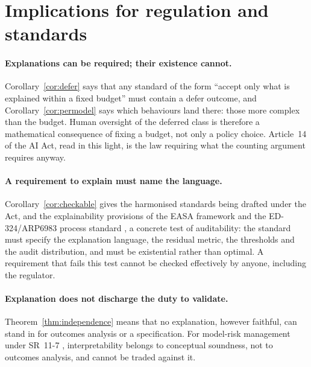 \documentclass[11pt,letterpaper]{article}
\theoremstyle{plain}
\theoremstyle{definition}
\theoremstyle{remark}
\begin{document}
\section{Implications for regulation and standards}
\label{sec:regulation}

\paragraph{Explanations can be required; their existence cannot.} Corollary~\ref{cor:defer} says that any standard of the form ``accept only what is explained within a fixed budget'' must contain a defer outcome, and Corollary~\ref{cor:permodel} says which behaviours land there: those more complex than the budget. Human oversight of the deferred class is therefore a mathematical consequence of fixing a budget, not only a policy choice. Article~14 of the AI Act, read in this light, is the law requiring what the counting argument requires anyway.

\paragraph{A requirement to explain must name the language.} Corollary~\ref{cor:checkable} gives the harmonised standards being drafted under the Act, and the explainability provisions of the EASA framework \citep{easa2024} and the ED-324/ARP6983 process standard \citep{ed324}, a concrete test of auditability: the standard must specify the explanation language, the residual metric, the thresholds and the audit distribution, and must be existential rather than optimal. A requirement that fails this test cannot be checked effectively by anyone, including the regulator.

\paragraph{Explanation does not discharge the duty to validate.} Theorem~\ref{thm:independence} means that no explanation, however faithful, can stand in for outcomes analysis or a specification. For model-risk management under SR~11-7 \citep{sr117}, interpretability belongs to conceptual soundness, not to outcomes analysis, and cannot be traded against it.
\end{document}
